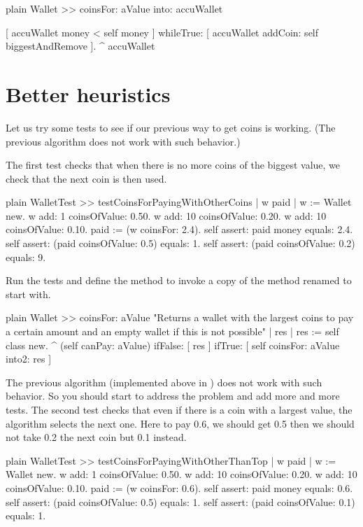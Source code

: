 \documentclass[10pt,twoside,english]{_support/latex/sbabook/sbabook}
\begin{document}
\begin{displaycode}{plain}
Wallet >> coinsFor: aValue into: accuWallet	
	
	[ accuWallet money < self money ]
			whileTrue: [ accuWallet addCoin: self biggestAndRemove ].
	^ accuWallet
\end{displaycode}
\section{Better heuristics}
Let us try some tests to see if our previous way to get coins is working. (The previous algorithm does not work with such behavior.) 

The first test checks that when there is no more coins of the biggest value, we check that the next coin
is then used. 

\begin{displaycode}{plain}
WalletTest >> testCoinsForPayingWithOtherCoins
	| w paid |
	w := Wallet new.
	w add: 1 coinsOfValue: 0.50.
	w add: 10 coinsOfValue: 0.20.
	w add: 10 coinsOfValue: 0.10.
	paid := (w coinsFor: 2.4).
	self assert: paid money equals: 2.4.
	self assert: (paid coinsOfValue: 0.5) equals: 1.
	self assert: (paid coinsOfValue: 0.2) equals: 9.
\end{displaycode}

Run the tests and define the method  to invoke a copy  of the method  renamed  to start with. 

\begin{displaycode}{plain}
Wallet >> coinsFor: aValue
	"Returns a wallet with the largest coins to pay a certain amount and an empty wallet if this is not possible"
	| res |
	res := self class new.
	^ (self canPay: aValue)
		ifFalse: [ res ]
		ifTrue: [ self coinsFor: aValue into2: res ] 
\end{displaycode}

	
The previous algorithm (implemented above in ) does not work with such behavior. So you should start to address the problem and add more and more tests. The second test checks that even if there is a coin with a largest value, the algorithm selects the next
one. Here to pay 0.6, we should get 0.5 then we should not take 0.2 the next coin but 0.1 instead.

\begin{displaycode}{plain}
WalletTest >> testCoinsForPayingWithOtherThanTop
	| w paid | 
	w := Wallet new.
	w add: 1 coinsOfValue: 0.50.
	w add: 10 coinsOfValue: 0.20.
	w add: 10 coinsOfValue: 0.10.
	paid := (w coinsFor: 0.6).
	self assert: paid money equals: 0.6.
	self assert: (paid coinsOfValue: 0.5) equals: 1.
	self assert: (paid coinsOfValue: 0.1) equals: 1.
\end{displaycode}
\end{document}
